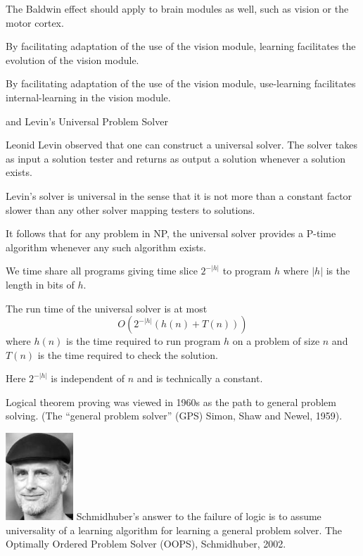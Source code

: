 {

The Baldwin effect should apply to brain modules as well, such as vision or the motor cortex.

\vfill
By facilitating adaptation of the use of the vision module, learning facilitates the evolution of the vision module.

\vfill
By facilitating adaptation of the use of the vision module, use-learning facilitates internal-learning in the vision module.

{and Levin's Universal Problem Solver}

Leonid Levin observed that one can construct a universal solver.  The solver takes as input a solution tester
and returns as output a solution whenever a solution exists.

  \vfill
Levin's solver is universal in the sense that it is not more than a constant factor slower than any other solver mapping testers to solutions.

\vfill
It follows that for any problem in NP, the universal solver provides a P-time algorithm whenever any such algorithm exists.


  
\vfill
We time share all programs giving time slice $2^{-|h|}$ to program $h$ where $|h|$
is the length in bits of $h$.

\vfill
The run time of the universal solver is at most
$$O(2^{-|h|}(h(n) + T(n)))$$
where $h(n)$ is the time required to run program $h$ on a problem of size $n$ and $T(n)$ is the time required to check the solution.

\vfill
Here $2^{-|h|}$ is independent of $n$ and is technically a constant.


Logical theorem proving was viewed in 1960s as the path to general problem solving. (The ``general problem solver'' (GPS) Simon, Shaw and Newel, 1959).

\vfill
\includegraphics[width= 1in]{../images/schmidhuber}
Schmidhuber's answer to the failure of logic is to assume universality of a learning algorithm for learning a general problem solver. The Optimally Ordered Problem Solver (OOPS), Schmidhuber, 2002.

}
